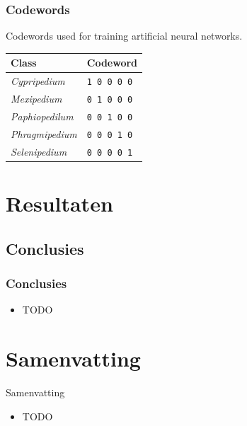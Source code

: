 \documentclass[]{beamer}
\begin{document}
    \begin{frame}
        \frametitle{Codewords}

        Codewords used for training artificial neural networks.

        \begin{table}[h]\scriptsize
            \begin{center}
            \begin{tabular}{ll}
            \toprule
            \textbf{Class} & \textbf{Codeword} \\
            \midrule
            \textit{Cypripedium}    & \texttt{1 0 0 0 0} \\
            \textit{Mexipedium}     & \texttt{0 1 0 0 0} \\
            \textit{Paphiopedilum}  & \texttt{0 0 1 0 0} \\
            \textit{Phragmipedium}  & \texttt{0 0 0 1 0} \\
            \textit{Selenipedium}   & \texttt{0 0 0 0 1} \\
            \bottomrule
            \end{tabular}
            \end{center}
        \end{table}
    \end{frame}

\section{Resultaten}

    \subsection{Conclusies}

    \begin{frame}
        \frametitle{Conclusies}

        \begin{itemize}
            \item {TODO}
        \end{itemize}
    \end{frame}

    \section*{Samenvatting}

    \begin{frame}{Samenvatting}
        \begin{itemize}
            \item TODO
        \end{itemize}
    \end{frame}
\end{document}
